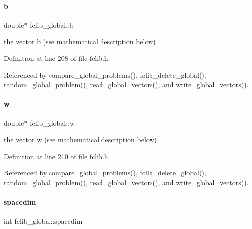 \mbox{\label{structfclib__global_a1badf3df92b120566a2ee3c42194972f}} 
\paragraph{\texorpdfstring{b}{b}}
{\footnotesize\ttfamily double$\ast$ fclib\+\_\+global\+::b}



the vector b (see mathematical description below) 



Definition at line 208 of file fclib.\+h.



Referenced by compare\+\_\+global\+\_\+problems(), fclib\+\_\+delete\+\_\+global(), random\+\_\+global\+\_\+problem(), read\+\_\+global\+\_\+vectors(), and write\+\_\+global\+\_\+vectors().

\mbox{\label{structfclib__global_a8b175716b6c1f84509cf44b36a76e7ca}} 
\paragraph{\texorpdfstring{w}{w}}
{\footnotesize\ttfamily double$\ast$ fclib\+\_\+global\+::w}



the vector w (see mathematical description below) 



Definition at line 210 of file fclib.\+h.



Referenced by compare\+\_\+global\+\_\+problems(), fclib\+\_\+delete\+\_\+global(), random\+\_\+global\+\_\+problem(), read\+\_\+global\+\_\+vectors(), and write\+\_\+global\+\_\+vectors().

\mbox{\label{structfclib__global_a86dac5928d2c652f15ac688df14989a0}} 
\paragraph{\texorpdfstring{spacedim}{spacedim}}
{\footnotesize\ttfamily int fclib\+\_\+global\+::spacedim}



